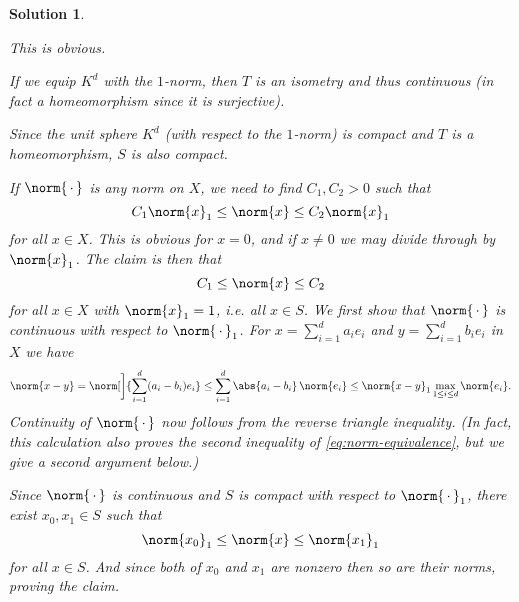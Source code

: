\documentclass[article, a4paper, 11pt, oneside]{memoir}
\numberwithin{equation}{chapter}
\theoremstyle{nonumberplain}
\newtheorem{solution}{Solution}
\begin{document}
\begin{solution}
\begin{solutionsec}
	\item This is obvious.
	
	\item If we equip $K^d$ with the $1$-norm, then $T$ is an isometry and thus continuous (in fact a homeomorphism since it is surjective).

	\item Since the unit sphere $K^d$ (with respect to the $1$-norm) is compact and $T$ is a homeomorphism, $S$ is also compact.

	\item If $\norm{\,\cdot\,}$ is any norm on $X$, we need to find $C_1,C_2 > 0$ such that
	\begin{equation}
		\label{eq:norm-equivalence}
		C_1 \norm{x}_1
			\leq \norm{x}
			\leq C_2 \norm{x}_1
	\end{equation}
	for all $x \in X$. This is obvious for $x = 0$, and if $x \neq 0$ we may divide through by $\norm{x}_1$. The claim is then that
	\begin{equation*}
		C_1
			\leq \norm{x}
			\leq C_2
	\end{equation*}
	for all $x \in X$ with $\norm{x}_1 = 1$, i.e. all $x \in S$. We first show that $\norm{\,\cdot\,}$ is continuous with respect to $\norm{\,\cdot\,}_1$. For $x = \sum_{i=1}^d a_i e_i$ and $y = \sum_{i=1}^d b_i e_i$ in $X$ we have
	\begin{equation*}
		\norm{x-y}
			= \norm[\bigg]{ \sum_{i=1}^d (a_i - b_i) e_i }
			\leq \sum_{i=1}^d \abs{a_i - b_i} \, \norm{e_i}
			\leq \norm{x-y}_1 \max_{1 \leq i \leq d} \norm{e_i}.
	\end{equation*}
	Continuity of $\norm{\,\cdot\,}$ now follows from the reverse triangle inequality. (In fact, this calculation also proves the second inequality of \cref{eq:norm-equivalence}, but we give a second argument below.)

	Since $\norm{\,\cdot\,}$ is continuous and $S$ is compact with respect to $\norm{\,\cdot\,}_1$, there exist $x_0, x_1 \in S$ such that
	\begin{equation*}
		\norm{x_0}_1
			\leq \norm{x}
			\leq \norm{x_1}_1
	\end{equation*}
	for all $x \in S$. And since both of $x_0$ and $x_1$ are nonzero then so are their norms, proving the claim.
\end{solutionsec}
\end{solution}
\end{document}
